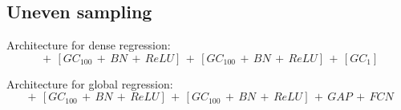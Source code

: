 \documentclass{article} %
\begin{document}









\subsection{Uneven sampling}

Architecture for dense regression:
\begin{dmath}
    [GC_{50}\, +\, BN\, +\, ReLU]\, +\, [GC_{100}\, +\, BN\, +\, ReLU]\, +\, [GC_{100}\, +\, BN\, +\, ReLU]\, +\, [GC_{1}]
\end{dmath}

Architecture for global regression:
\begin{dmath}
    [GC_{50}\, +\, BN\, +\, ReLU]\, +\, [GC_{100}\, +\, BN\, +\, ReLU]\, +\, [GC_{100}\, +\, BN\, +\, ReLU]\, +\, GAP\, +\, FCN
\end{dmath}
\end{document}
